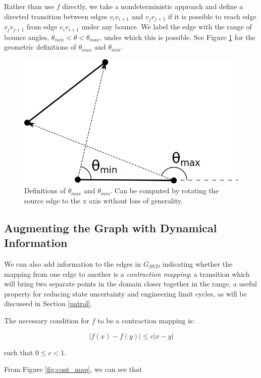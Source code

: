 \documentclass[]{article}  %
\begin{document}
Rather than use $f$ directly, we take a nondeterministic approach and define a
directed transition between edges $v_i v_{i+1}$ and $v_j v_{j+1}$ if it is
possible to reach edge $v_j v_{j+1}$ from edge $v_i v_{i+1}$ under any bounce.
We label the edge with the range of bounce angles, $\theta_{min} < \theta <
\theta_{max}$, under which this is possible. See Figure \ref{fig:bounce_range} for
the geometric definitions of $\theta_{max}$ and $\theta_{min}$.

\begin{figure}
    \includegraphics[width=0.8\linewidth]{figures/bouncerange.png}
    \centering
    \caption{Definitions of $\theta_{max}$ and $\theta_{min}$. Can be computed
by rotating the source edge to the x axis without loss of generality.}\label{fig:bounce_range}
    \centering
\end{figure}

\subsection{Augmenting the Graph with Dynamical Information}

We can also add information to the edges in $G_{BVD}$ indicating whether the
mapping from one edge to another is a \emph{contraction mapping}: a transition
which will bring two separate points in the domain closer together in the range,
a useful property for reducing state uncertainty and engineering limit cycles,
as will be discussed in Section \ref{patrol}.

The necessary condition for $f$ to be a contraction mapping is:

\begin{equation*}
|f(x) - f(y)| \leq c |x-y|
\end{equation*}

such that $0 \leq c < 1$.

From Figure \ref{fig:cont_map}, we can see that
\end{document}
